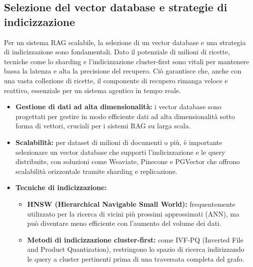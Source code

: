 \documentclass[a4paper, 11pt]{article}
\begin{document}
\subsection{Selezione del vector database e strategie di indicizzazione}
Per un sistema RAG scalabile, la selezione di un vector database e una strategia di indicizzazione sono fondamentali. Dato il potenziale di milioni di ricette, tecniche come lo sharding e l'indicizzazione cluster-first sono vitali per mantenere bassa la latenza e alta la precisione del recupero. \cite{scaling_rag_millions} Ciò garantisce che, anche con una vasta collezione di ricette, il componente di recupero rimanga veloce e reattivo, essenziale per un sistema agentico in tempo reale.
\begin{itemize}
    \item \textbf{Gestione di dati ad alta dimensionalità:} i vector database sono progettati per gestire in modo efficiente dati ad alta dimensionalità sotto forma di vettori, cruciali per i sistemi RAG su larga scala. \cite{vector_databases_tutorial}
    \item \textbf{Scalabilità:} per dataset di milioni di documenti o più, è importante selezionare un vector database che supporti l'indicizzazione e le query distribuite, con soluzioni come Weaviate, Pinecone e PGVector che offrono scalabilità orizzontale tramite sharding e replicazione. \cite{scaling_rag_millions}
    \item \textbf{Tecniche di indicizzazione:}
    \begin{itemize}
        \item \textbf{HNSW (Hierarchical Navigable Small World):} frequentemente utilizzato per la ricerca di vicini più prossimi approssimati (ANN), ma può diventare meno efficiente con l'aumento del volume dei dati. \cite{scaling_rag_millions}
        \item \textbf{Metodi di indicizzazione cluster-first:} come IVF-PQ (Inverted File and Product Quantization), restringono lo spazio di ricerca indirizzando le query a cluster pertinenti prima di una traversata completa del grafo. \cite{scaling_rag_millions}
    \end{itemize}
\end{itemize}
\end{document}
